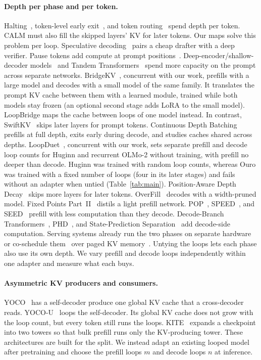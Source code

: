\documentclass[11pt]{article}
\begin{document}
\paragraph{Depth per phase and per token.} Halting~\citep{act,pondernet}, token-level early
exit~\citep{deebert,depthadaptive,calm,layerskip,skipdecode}, and token routing~\citep{mod} spend depth per token.
CALM must also fill the skipped layers' KV for later tokens. Our maps solve this problem per loop. Speculative
decoding~\citep{specdecoding,specsampling} pairs a cheap drafter with a deep verifier. Pause tokens add compute at
prompt positions~\citep{pausetokens}. Deep-encoder/shallow-decoder models~\citep{deepshallow,llm2slm} and
Tandem Transformers~\citep{tandem} spend more capacity on the prompt across separate networks. BridgeKV~\citep{bridgekv},
concurrent with our work, prefills with a large model and decodes with a small model of the same family. It translates the
prompt KV cache between them with a learned module, trained while both models stay frozen (an optional second stage
adds LoRA to the small model). LoopBridge maps the cache between loops of one model instead. In
contrast, SwiftKV~\citep{swiftkv} skips later layers for prompt tokens. Continuous Depth Batching~\citep{cdb} prefills
at full depth, exits early during decode, and studies caches shared across depths. LoopDuet~\citep{loopduet},
concurrent with our work, sets separate prefill and decode loop counts for Huginn and recurrent OLMo-2 without training,
with prefill no deeper than decode. Huginn was trained with random loop counts, whereas Ouro was trained with a
fixed number of loops (four in its later stages) and fails without an adapter when untied (Table~\ref{tab:main}). Position-Aware Depth Decay~\citep{padd} skips
more layers for later tokens. OverFill~\citep{overfill} decodes with a width-pruned model. Fixed Points
Part~II~\citep{fixedpoints2} distils a light prefill network. POP~\citep{pop}, SPEED~\citep{speed}, and
SEED~\citep{seedemit} prefill with less computation than they decode. Decode-Branch Transformers~\citep{decodebranch},
PHD~\citep{phd}, and State-Prediction Separation~\citep{sps} add decode-side computation. Serving systems already run
the two phases on separate hardware~\citep{distserve,splitwise,mooncake} or co-schedule them~\citep{sarathiserve} over
paged KV memory~\citep{vllm}. Untying the loops lets each phase also use its own depth. We vary prefill and decode
loops independently within one adapter and measure what each buys.

\paragraph{Asymmetric KV producers and consumers.} YOCO~\citep{yoco} has a self-decoder produce one global KV cache
that a cross-decoder reads. YOCO-U~\citep{yocou} loops the self-decoder. Its global KV cache does not grow with the
loop count, but every token still runs the loops. KITE~\citep{kite} expands a checkpoint into two towers so that bulk
prefill runs only the KV-producing tower. These architectures are built for the split. We instead adapt an existing
looped model after pretraining and choose the prefill loops $m$ and decode loops $n$ at inference.
\end{document}
